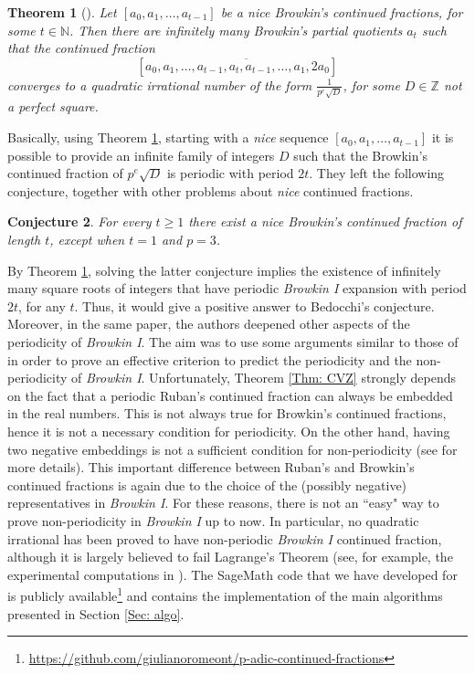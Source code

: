 \documentclass[12pt, reqno]{amsart}
\theoremstyle{plain}
\newtheorem{Theorem}{Theorem}
\newtheorem{Conjecture}[Theorem]{Conjecture}
\theoremstyle{definition}
\begin{document}
\begin{Theorem}[\cite{CMT}]\label{Thm: nice}
Let $[a_0,a_1,\ldots,a_{t-1}]$ be a \textit{nice} Browkin's continued fractions, for some $t\in\mathbb{N}$. Then there are infinitely many Browkin's partial quotients $a_t$ such that the continued fraction
\[[a_0,\overline{a_1,\ldots,a_{t-1},a_t,a_{t-1},\ldots,a_1,2a_0}]\]
converges to a quadratic irrational number of the form $\frac{1}{p^{e}\sqrt{D}}$, for some $D\in\mathbb{Z}$ not a perfect square.
\end{Theorem}

Basically, using Theorem \ref{Thm: nice}, starting with a \textit{nice} sequence $[a_0,a_1,\ldots,a_{t-1}]$ it is possible to provide an infinite family of integers $D$ such that the Browkin's continued fraction of $p^e\sqrt{D}$ is periodic with period $2t$. They left the following conjecture, together with other problems about \textit{nice} continued fractions.

\begin{Conjecture}
For every $t\geq 1$ there exist a \textit{nice} Browkin's continued fraction of length $t$, except when $t=1$ and $p=3$. 
\end{Conjecture}

By Theorem \ref{Thm: nice}, solving the latter conjecture implies the existence of infinitely many square roots of integers that have periodic \textit{Browkin I} expansion with period $2t$, for any $t$. Thus, it would give a positive answer to Bedocchi's conjecture. Moreover, in the same paper, the authors deepened other aspects of the periodicity of \textit{Browkin I}. The aim was to use some arguments similar to those of \cite{CVZ} in order to prove an effective criterion to predict the periodicity and the non-periodicity of \textit{Browkin I}. Unfortunately, Theorem \ref{Thm: CVZ} strongly depends on the fact that a periodic Ruban's continued fraction can always be embedded in the real numbers. This is not always true for Browkin's continued fractions, hence it is not a necessary condition for periodicity. On the other hand, having two negative embeddings is not a sufficient condition for non-periodicity (see \cite{CMT} for more details). This important difference between Ruban's and Browkin's continued fractions is again due to the choice of the (possibly negative) representatives in \textit{Browkin I}. For these reasons, there is not an ``easy" way to prove non-periodicity in \textit{Browkin I} up to now. In particular, no quadratic irrational has been proved to have non-periodic \textit{Browkin I} continued fraction, although it is largely believed to fail Lagrange's Theorem (see, for example, the experimental computations in \cite{MR}). The SageMath code that we have developed for \cite{MR} is publicly available\footnote{\href{https://github.com/giulianoromeont/p-adic-continued-fractions}{https://github.com/giulianoromeont/p-adic-continued-fractions}} and contains the implementation of the main algorithms presented in Section \ref{Sec: algo}. \\
\end{document}
